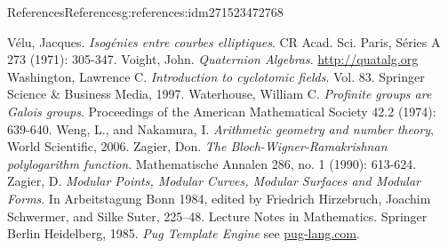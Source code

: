 \documentclass[oneside,10pt,]{book}
\numberwithin{equation}{section}
\begin{document}
\begin{references-chapter-numberless}{References}{}{References}{}{}{g:references:idm271523472768}
\begin{thebibliography}{9}
\hypertarget{x:biblio:bib-velu}{}Vélu, Jacques. \textit{Isogénies entre courbes elliptiques}. CR Acad. Sci. Paris, Séries A 273 (1971): 305-347.
\hypertarget{x:biblio:bib-voight-quat}{}Voight, John. \textit{Quaternion Algebras}. \url{http://quatalg.org}
\hypertarget{x:biblio:bib-washington}{}Washington, Lawrence C. \textit{Introduction to cyclotomic fields}. Vol. 83. Springer Science \& Business Media, 1997.
\hypertarget{x:biblio:bib-waterhouse}{}Waterhouse, William C.  \textit{Profinite groups are Galois groups}. Proceedings of the American Mathematical Society 42.2 (1974): 639-640.
\hypertarget{x:biblio:bib-weng-nakamura}{}Weng, L., and Nakamura, I. \textit{Arithmetic geometry and number theory}, World Scientific, 2006.
\hypertarget{x:biblio:bib-zag-ram}{}Zagier, Don.  \textit{The Bloch-Wigner-Ramakrishnan polylogarithm function}. Mathematische Annalen 286, no. 1 (1990): 613-624.
\hypertarget{x:biblio:bib-zagier-modular}{}Zagier, D. \textit{Modular Points, Modular Curves, Modular Surfaces and Modular Forms}. In Arbeitstagung Bonn 1984, edited by Friedrich Hirzebruch, Joachim Schwermer, and Silke Suter, 225–48. Lecture Notes in Mathematics. Springer Berlin Heidelberg, 1985.
\hypertarget{x:biblio:bib-pug}{}\textit{Pug Template Engine} see \href{http://pug-lang.com/}{pug-lang.com}.
\end{thebibliography}
\end{references-chapter-numberless}
\end{document}
